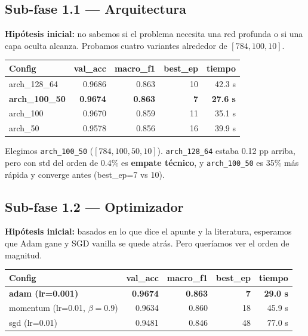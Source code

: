 \documentclass[11pt,a4paper]{article}
\newcommand{\winner}[1]{\cellcolor{accent2!15}\textbf{#1}}
\begin{document}
\subsection{Sub-fase 1.1 — Arquitectura}

\textbf{Hipótesis inicial:} no sabemos si el problema necesita una red profunda o si una capa oculta alcanza. Probamos cuatro variantes alrededor de $[784,100,10]$.

\begin{center}
\small
\begin{tabular}{@{}lrrrr@{}}
\toprule
\textbf{Config} & \textbf{val\_acc} & \textbf{macro\_f1} & \textbf{best\_ep} & \textbf{tiempo} \\
\midrule
arch\_128\_64        & 0.9686 & 0.863 & 10 & 42.3 s \\
\winner{arch\_100\_50}     & \winner{0.9674} & \winner{0.863} & \winner{7}  & \winner{27.6 s} \\
arch\_100            & 0.9670 & 0.859 & 11 & 35.1 s \\
arch\_50             & 0.9578 & 0.856 & 16 & 39.9 s \\
\bottomrule
\end{tabular}
\end{center}

\begin{decidimos}
Elegimos \texttt{arch\_100\_50} ($[784, 100, 50, 10]$). \texttt{arch\_128\_64} estaba 0.12 pp arriba, pero con std del orden de 0.4\% es \textbf{empate técnico}, y \texttt{arch\_100\_50} es 35\% más rápida y converge antes (best\_ep=7 vs 10).
\end{decidimos}

\subsection{Sub-fase 1.2 — Optimizador}

\textbf{Hipótesis inicial:} basados en lo que dice el apunte y la literatura, esperamos que Adam gane y SGD vanilla se quede atrás. Pero queríamos ver el orden de magnitud.

\begin{center}
\small
\begin{tabular}{@{}lrrrr@{}}
\toprule
\textbf{Config} & \textbf{val\_acc} & \textbf{macro\_f1} & \textbf{best\_ep} & \textbf{tiempo} \\
\midrule
\winner{adam (lr=0.001)}     & \winner{0.9674} & \winner{0.863} & \winner{7}  & \winner{29.0 s} \\
momentum (lr=0.01, $\beta=0.9$)  & 0.9634 & 0.860 & 18 & 45.9 s \\
sgd (lr=0.01)        & 0.9481 & 0.846 & 48 & 77.0 s \\
\bottomrule
\end{tabular}
\end{center}
\end{document}
